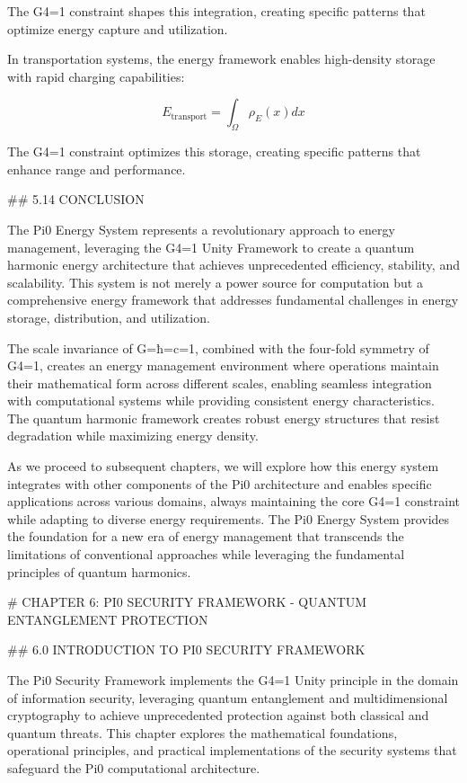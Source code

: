 The G4=1 constraint shapes this integration, creating specific patterns that optimize energy capture and utilization.

In transportation systems, the energy framework enables high-density storage with rapid charging capabilities:

$$E_{\text{transport}} = \int_{\Omega} \rho_E(x) dx$$

The G4=1 constraint optimizes this storage, creating specific patterns that enhance range and performance.

## 5.14 CONCLUSION

The Pi0 Energy System represents a revolutionary approach to energy management, leveraging the G4=1 Unity Framework to create a quantum harmonic energy architecture that achieves unprecedented efficiency, stability, and scalability. This system is not merely a power source for computation but a comprehensive energy framework that addresses fundamental challenges in energy storage, distribution, and utilization.

The scale invariance of G=ħ=c=1, combined with the four-fold symmetry of G4=1, creates an energy management environment where operations maintain their mathematical form across different scales, enabling seamless integration with computational systems while providing consistent energy characteristics. The quantum harmonic framework creates robust energy structures that resist degradation while maximizing energy density.

As we proceed to subsequent chapters, we will explore how this energy system integrates with other components of the Pi0 architecture and enables specific applications across various domains, always maintaining the core G4=1 constraint while adapting to diverse energy requirements. The Pi0 Energy System provides the foundation for a new era of energy management that transcends the limitations of conventional approaches while leveraging the fundamental principles of quantum harmonics.

# CHAPTER 6: PI0 SECURITY FRAMEWORK - QUANTUM ENTANGLEMENT PROTECTION

## 6.0 INTRODUCTION TO PI0 SECURITY FRAMEWORK

The Pi0 Security Framework implements the G4=1 Unity principle in the domain of information security, leveraging quantum entanglement and multidimensional cryptography to achieve unprecedented protection against both classical and quantum threats. This chapter explores the mathematical foundations, operational principles, and practical implementations of the security systems that safeguard the Pi0 computational architecture.

